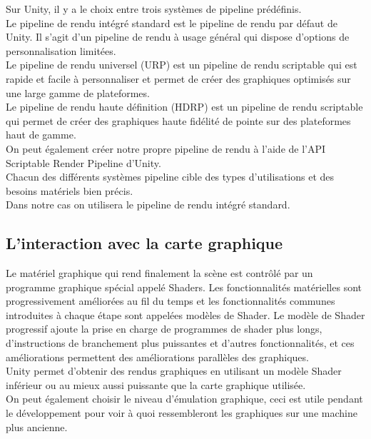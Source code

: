 Sur Unity, il y a le choix entre trois systèmes de pipeline prédéfinis.\\

Le pipeline de rendu intégré standard est le pipeline de rendu par défaut de Unity. Il s'agit d'un pipeline de rendu à usage général qui dispose d'options de personnalisation limitées.\\

Le pipeline de rendu universel (URP) est un pipeline de rendu scriptable qui est rapide et facile à personnaliser et permet de créer des graphiques optimisés sur une large gamme de plateformes.\\

Le pipeline de rendu haute définition (HDRP) est un pipeline de rendu scriptable qui permet de créer des graphiques haute fidélité de pointe sur des plateformes haut de gamme.\\

On peut également créer notre propre pipeline de rendu à l'aide de l'API Scriptable Render Pipeline d'Unity.\\

Chacun des différents systèmes pipeline cible des types d'utilisations et des besoins matériels bien précis.\\

Dans notre cas on utilisera le pipeline de rendu intégré standard.

\subsection{\textbf{L'interaction avec la carte graphique}}

Le matériel graphique \cite{graphic} qui rend finalement la scène est contrôlé par un programme graphique spécial appelé Shaders. Les fonctionnalités matérielles sont progressivement améliorées au fil du temps et les fonctionnalités communes introduites à chaque étape sont appelées modèles de Shader. Le modèle de Shader progressif ajoute la prise en charge de programmes de shader plus longs, d'instructions de branchement plus puissantes et d'autres fonctionnalités, et ces améliorations permettent des améliorations parallèles des graphiques.\\

Unity permet d'obtenir des rendus graphiques en utilisant un modèle Shader inférieur ou au mieux aussi puissante que la carte graphique utilisée. \\

On peut également choisir le niveau d'émulation graphique, ceci est utile pendant le développement pour voir à quoi ressembleront les graphiques sur une machine plus ancienne.\\

